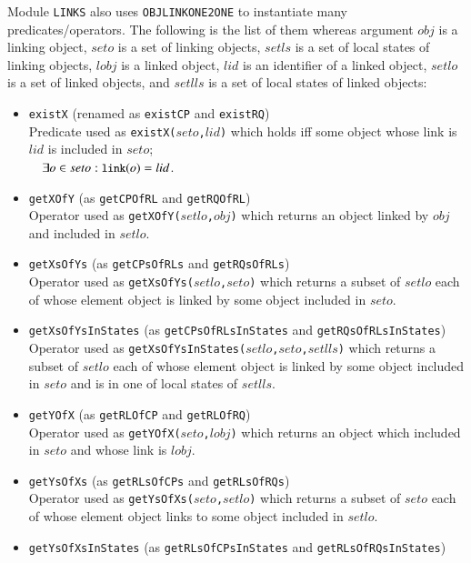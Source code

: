 \documentclass[12pt]{report}
\newcommand{\mbstt}[1]{\mbox{\small{\tt {#1}}}}
\newcommand{\stt}[1]{{\small{\tt {#1}}}}
\begin{document}
Module {\tt LINKS} also uses {\tt OBJLINKONE2ONE} to instantiate many
predicates/operators. The following is the list of them whereas argument
$\mathit{obj}$ is a linking object, $seto$ is a set of linking objects, $setls$
is a set of local states of linking objects, $\mathit{lobj}$ is a linked
object, $lid$ is an identifier of a linked object, $setlo$ is a set of
linked objects, and $setlls$ is a set of local states of linked
objects:
\begin{itemize}
\item \stt{existX} (renamed as \stt{existCP} and \stt{existRQ})\\
  Predicate used as \stt{existX($seto$,$lid$)} which holds iff some
  object whose link is $lid$ is included in $seto$;\\$~~~~\exists o\in
  seto: \mbstt{link}(o)=lid$.
\item \stt{getXOfY} (as \stt{getCPOfRL} and \stt{getRQOfRL})\\
  Operator used as \stt{getXOfY($setlo$,$\mathit{obj}$)} which returns an
  object linked by $\mathit{obj}$ and included in $setlo$.
\item \stt{getXsOfYs} (as \stt{getCPsOfRLs} and \stt{getRQsOfRLs})\\
  Operator used as \stt{getXsOfYs($setlo$,$seto$)} which returns a
  subset of $setlo$ each of whose element object is linked by some
  object included in $seto$.
\item \stt{getXsOfYsInStates} (as \stt{getCPsOfRLsInStates} and \stt{getRQsOfRLsInStates})\\
  Operator used as \stt{getXsOfYsInStates($setlo$,$seto$,$setlls$)}
  which returns a subset of $setlo$ each of whose element object is
  linked by some object included in $seto$ and is in one of local
  states of $setlls$.
\item \stt{getYOfX} (as \stt{getRLOfCP} and
  \stt{getRLOfRQ})\\ Operator used as \stt{getYOfX($seto$,$\mathit{lobj}$)}
  which returns an object which included in $seto$ and whose link is
  $\mathit{lobj}$.
\item \stt{getYsOfXs} (as \stt{getRLsOfCPs} and \stt{getRLsOfRQs})\\
  Operator used as \stt{getYsOfXs($seto$,$setlo$)} which returns a
  subset of $seto$ each of whose element object links to some object
  included in $setlo$.
\item \stt{getYsOfXsInStates} (as \stt{getRLsOfCPsInStates} and \stt{getRLsOfRQsInStates})\\

\end{itemize}
\end{document}
